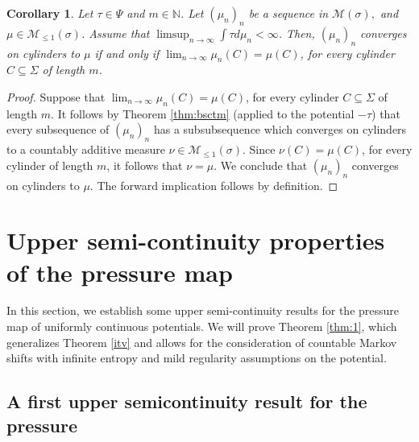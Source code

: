 \documentclass[letterpaper,11pt]{amsart}
\theoremstyle{plain}
\theoremstyle{plain}
\newtheorem{corollary}[proposition]{Corollary}
\theoremstyle{definition}
\theoremstyle{remark}
\def\N{{\mathbb N}}
\def\M{{\mathcal M}}
\begin{document}
\begin{corollary}\label{lem:ui} Let $\tau\in \Psi$ and $m\in \N$. Let $(\mu_n)_n$ be a sequence in $\M(\sigma),$ and $\mu\in\M_{\le1}(\sigma)$. Assume that $\limsup_{n\to\infty}\int \tau d\mu_n<\infty$. Then, $(\mu_n)_n$ converges on cylinders to $\mu$ if and only if $\lim_{n\to\infty}\mu_n(C)=\mu(C)$, for every cylinder $C\subseteq\Sigma$ of length $m$.
\end{corollary}
\begin{proof} Suppose that $\lim_{n\to\infty}\mu_n(C)=\mu(C)$, for every cylinder $C\subseteq\Sigma$ of length $m$. It follows by Theorem \ref{thm:bsctm} (applied to the potential $-\tau$) that every subsequence of  $(\mu_n)_n$ has a subsubsequence which converges on cylinders to a countably additive measure $\nu\in\M_{\le 1}(\sigma)$. Since $\nu(C)=\mu(C)$, for every cylinder of length $m$, it follows that $\nu=\mu$. We conclude that $(\mu_n)_n$ converges on cylinders to $\mu$. The forward implication follows by definition. 
\end{proof}



\section{Upper semi-continuity properties of the pressure map}\label{infinite}

In this section, we establish some upper semi-continuity results for the pressure map of uniformly continuous potentials. We will prove Theorem \ref{thm:1}, which generalizes Theorem \ref{itv} and allows for the consideration of countable Markov shifts with infinite entropy and mild regularity assumptions on the potential.
 
\subsection{A first upper semicontinuity result for the pressure}\label{subsec:51}

\end{document}
